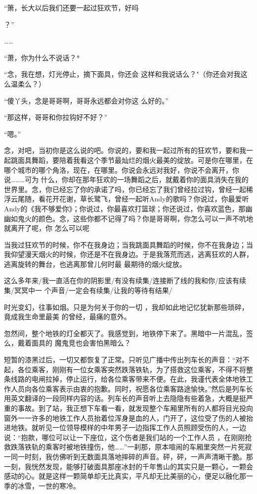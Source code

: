 \documentclass{article}
\begin{document}
“箫，长大以后我们还要一起过狂欢节，好吗
\newpage

？” 


…… 


“萧，你为什么不说话？* 

“念，我在想，灯光停止，摘下面具，你还会
这样和我说话么？"（你还会对我这么温柔么？） 

“傻丫头，念是哥哥啊，哥哥永远都会对你这
么好的。” 


“那这样，哥哥和你拉钩好不好？” 


“嗯。” 

念，对吧，当初你是这么说的吧。你说的，要和我一起过所有的狂欢节，要和我一起跳面具舞蹈，要陪着我看这个季节最灿烂的烟火最美的绽放。可是你在哪里，在哪个城市的哪个角洛，现在，在哪里。你说会永远对我好，你说不会离开，你说………可为
\newpage
什么，你却在那年狂欢的一场舞蹈之后，就戴着你的面具消失在我的世界里。念，你已经忘了你的承诺了吗，你已经忘了我们曾经拉过钩，曾经一起稀浮云尾随，看花开花谢，草长鹭飞，曾经一起听Andy的歌吗？你说过，你最爱听Andy的《我不够爱你》；你说过，你最喜欢打篮球；你还说过，你喜欢蓝色，那幽幽如鬼火的颜色。念，这些你都不记得了吗？你是哥哥啊，你怎么可以一声不吭地就离开了呢，你
怎么可以呢 

当我过狂欢节的时候，你不在我身边；当我跳面具舞蹈的时候，你不在我身边；当我仰望漫天烟火的时候，你还是不在我身边。于是我落荒而逃，逃离狂欢的人群，逃离旋转的舞台，也逃离那曾儿何时最
最期待的烟火绽放。 

这么多年来/我一直活在你的阴影里/有没有续集/连接断了线的我和你/应该有续集/冥冥中一
个声音/一定会有续集/让我的等待有结果/ 

时光变幻，往事如烟。只是为何关于你的一切
\newpage
，我却如此地记忆犹新那些琐碎，竟成我生命里最美
的曾经，最痛的意外。 

忽然间，整个地铁的灯全都灭了。我感觉到，地铁停下来了。黑暗中一片混乱，签么，戴着面具的
魔鬼竞也会害怕黑暗么？ 

短暂的漆黑过后，一切又都恢复了正常。只听见广播中传出列车长的声音：“对不起，各位乘客，刚刚有一位女乘客突然跌落铁轨，为了搭救这位乘客，不得不将整条线路的电闸拉掉，停止运行，给各位乘客带来不便。在此，我谨代表全体地铁工作人员向各位乘客表示由衷的抱歉。同时，祝愿各位乘客路途愉快。”然后是列车长用英文翻译的一段同样内容的话。列车长的声音听上去隐隐有些着急，大概是挺严重的事故。到了站，我正想下车看一看，就发现整个车厢里所有的人都将目光投向窗外一一许多的地铁工作人员抬着位浑身是血的人，门开了，这位受了伤的人被抬进地铁。就听见一位领导模样的中年男子一边指挥工作人员照顾受伤的人，一边说：“抱款，哪位可以让一下座位，这个伤者是我们站的一个工作人员
\newpage
，在刚刚抢救跌落铁轨的乘客时被地铁撞伤，他……”一刹那，原本喧闹的车厢里突然一片死寂一同一时刻，我仿佛听到无数面具落地摔碎的声音。砰，砰，一声声清晰干脆。那一刻，我恍然发现，能够打破面具那座冰封的千年售山的其实只是一颗心，一颗会感动的心。就是这样一颗简单却无比真实，平凡却无比美丽的心，便足以融化那一季的冰雪，一世的寒冷。
\end{document}
